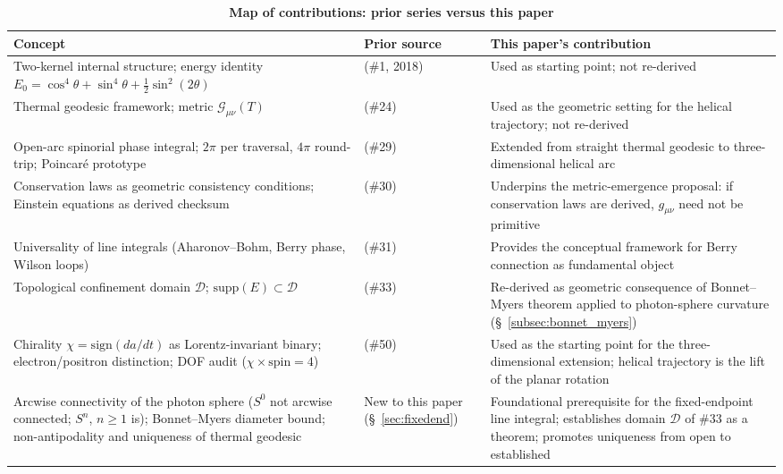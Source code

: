\documentclass[%
 reprint, amsmath,amssymb, aps, prb, ]{revtex4-2}
\numberwithin{equation}{section}
\newcommand{\iphase}{\theta}  %
\begin{document}
\begin{table}[t!]
\centering
\caption{\textbf{Map of contributions: prior series versus this paper}}
\label{tab:contributions51}
\renewcommand{\arraystretch}{1.4}
\begin{tabular}{p{7.0cm}p{3.5cm}p{6.5cm}}
\toprule
\textbf{Concept} & \textbf{Prior source} & \textbf{This paper's contribution} \\
\midrule
Two-kernel internal structure; energy identity $E_0 = \cos^4\iphase + \sin^4\iphase + \tfrac{1}{2}\sin^2(2\iphase)$
& \cite{hanamura01} (\#1, 2018)
& Used as starting point; not re-derived \\
\addlinespace[0.3cm]
Thermal geodesic framework; metric $\mathcal{G}_{\mu\nu}(T)$
& \cite{hanamura24} (\#24)
& Used as the geometric setting for the helical trajectory; not re-derived \\
\addlinespace[0.3cm]
Open-arc spinorial phase integral; $2\pi$ per traversal, $4\pi$ round-trip; Poincar\'{e} prototype
& \cite{hanamura29} (\#29)
& Extended from straight thermal geodesic to three-dimensional helical arc \\
\addlinespace[0.3cm]
Conservation laws as geometric consistency conditions; Einstein equations as derived checksum
& \cite{hanamura30} (\#30)
& Underpins the metric-emergence proposal: if conservation laws are derived, $g_{\mu\nu}$ need not be primitive \\
\addlinespace[0.3cm]
Universality of line integrals (Aharonov--Bohm, Berry phase, Wilson loops)
& \cite{hanamura31} (\#31)
& Provides the conceptual framework for Berry connection as fundamental object \\
\addlinespace[0.3cm]
Topological confinement domain $\mathcal{D}$; $\mathrm{supp}(E)\subset\mathcal{D}$
& \cite{hanamura33} (\#33)
& Re-derived as geometric consequence of Bonnet--Myers theorem applied to photon-sphere curvature (§~\ref{subsec:bonnet_myers}) \\
\addlinespace[0.3cm]
Chirality $\chi = \mathrm{sign}(da/dt)$ as Lorentz-invariant binary; electron/positron distinction; DOF audit ($\chi\times\mathrm{spin}=4$)
& \cite{hanamura50} (\#50)
& Used as the starting point for the three-dimensional extension; helical trajectory is the lift of the planar rotation \\
\addlinespace[0.3cm]
Arcwise connectivity of the photon sphere ($S^0$ not arcwise connected; $S^n$, $n\geq 1$ is); Bonnet--Myers diameter bound; non-antipodality and uniqueness of thermal geodesic
& New to this paper (§~\ref{sec:fixedend})
& Foundational prerequisite for the fixed-endpoint line integral; establishes domain $\mathcal{D}$ of \#33 as a theorem; promotes uniqueness from open to established \\

\end{tabular}
\end{table}
\end{document}

